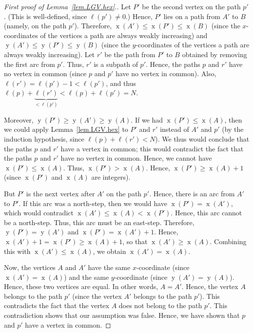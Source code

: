 \documentclass[reqno]{amsart}
\newcommand{\0}{\phantom{c}}
\DeclareMathOperator{\xcoord}{x} %
\DeclareMathOperator{\ycoord}{y} %
\newenvironment{verlonglong}{}{}
\theoremstyle{plain}
\theoremstyle{definition}
\numberwithin{equation}{section}
\begin{document}
\begin{verlonglong}
\begin{proof}[First proof of Lemma~\ref{lem.LGV.hex}.]
Let $P'$ be the second vertex on the path $p'$.
(This is well-defined, since $\ell(p') \neq0 $.)
Hence, $P'$ lies on a path from $A'$ to $B$ (namely, on the path $p'$).
Therefore, $\xcoord(A') \leq \xcoord(P') \leq \xcoord(B)$ (since the $x$-coordinates of the vertices a path are always weakly increasing) and $\ycoord(A') \leq \ycoord(P') \leq \ycoord(B)$ (since the $y$-coordinates of the vertices a path are always weakly increasing).
Let $r'$ be the path from $P'$ to $B$ obtained by removing the first arc from $p'$.
Thus, $r'$ is a subpath of $p'$.
Hence, the paths $p$ and $r'$ have no vertex in common (since $p$ and $p'$ have no vertex in common).
Also, $\ell(r') = \ell(p') - 1 < \ell(p')$, and thus $\ell(p) + \underbrace{\ell(r')}_{<\ell(p')} < \ell(p) + \ell(p') = N$.

Moreover, $\ycoord(P') \geq \ycoord(A') \geq \ycoord(A)$.
If we had $\xcoord(P') \leq \xcoord(A)$, then we could apply Lemma~\ref{lem.LGV.hex} to $P'$ and $r'$ instead of $A'$ and $p'$ (by the induction hypothesis, since $\ell(p) + \ell(r') < N$).
We thus would conclude that the paths $p$ and $r'$ have a vertex in common; this would contradict the fact that the paths $p$ and $r'$ have no vertex in common.
Hence, we cannot have $\xcoord(P') \leq \xcoord(A)$.
Thus, $\xcoord(P') > \xcoord(A)$.
Hence, $\xcoord(P') \geq \xcoord(A) + 1$ (since $\xcoord(P')$ and $\xcoord(A)$ are integers).

But $P'$ is the next vertex after $A'$ on the path $p'$.
Hence, there is an arc from $A'$ to $P'$.
If this arc was a north-step, then we would have $\xcoord(P') = \xcoord(A')$, which would contradict $\xcoord(A') \leq \xcoord(A) < \xcoord(P')$.
Hence, this arc cannot be a north-step.
Thus, this arc must be an east-step.
Therefore, $\ycoord(P') = \ycoord(A')$ and $\xcoord(P') = \xcoord(A') + 1$.
Hence, $\xcoord(A') + 1 = \xcoord(P') \geq \xcoord(A) + 1$, so that $\xcoord(A') \geq \xcoord(A)$.
Combining this with $\xcoord(A') \leq \xcoord(A)$, we obtain $\xcoord(A') = \xcoord(A)$.

Now, the vertices $A$ and $A'$ have the same $x$-coordinate (since $\xcoord(A') = \xcoord(A)$) and the same $y$-coordinate (since $\ycoord(A') = \ycoord(A)$).
Hence, these two vertices are equal.
In other words, $A = A'$.
Hence, the vertex $A$ belongs to the path $p'$ (since the vertex $A'$ belongs to the path $p'$).
This contradicts the fact that the vertex $A$ does not belong to the path $p'$.
This contradiction shows that our assumption was false.
Hence, we have shown that $p$ and $p'$ have a vertex in common.


\end{proof}
\end{verlonglong}
\end{document}
